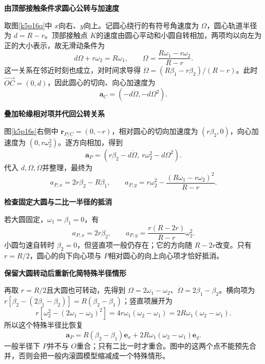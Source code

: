 \begin{solution}\textbf{由顶部接触条件求圆心公转与加速度}\par\nobreak
取图\ref{k5p16q}中 $x$向右、$y$向上。记圆心绕行的有符号角速度为 $\Omega$，圆心轨道半径为 $d=R-r$。顶部接触点 $K$的速度由圆心平动和小圆自转相加，两项均以向左为正的大小表示，故无滑动条件为
\[d\Omega+r\omega_2=R\omega_1,\qquad
\Omega=\frac{R\omega_1-r\omega_2}{R-r}.\]
这一关系在邻近时刻也成立，对时间求导得 $\dot\Omega=(R\beta_1-r\beta_2)/(R-r)$。此时 $\overrightarrow{OC}=(0,d)$，因此圆心的切向、向心加速度为
\[\bm a_C=(-d\dot\Omega,-d\Omega^2).\]



\par\medskip{}\noindent\textbf{叠加轮缘相对项并代回公转关系}\par\nobreak
图\ref{k5p16s}右侧中 $\bm r_{P/C}=(0,-r)$，相对圆心的切向加速度为 $(r\beta_2,0)$，向心加速度为 $(0,r\omega_2^2)$。逐方向相加，得到
\[\bm a_P=(r\beta_2-d\dot\Omega,\ r\omega_2^2-d\Omega^2).\]
代入 $d,\Omega,\dot\Omega$并整理，最终为
\[\boxed{a_{P,x}=2r\beta_2-R\beta_1},\qquad
\boxed{a_{P,y}=r\omega_2^2-\frac{(R\omega_1-r\omega_2)^2}{R-r}}.\]



\par\medskip{}\noindent\textbf{检查固定大圆与二比一半径的抵消}\par\nobreak
若大圆固定，$\omega_1=\beta_1=0$，有
\[a_{P,x}=2r\beta_2,\qquad
a_{P,y}=\frac{r(R-2r)}{R-r}\omega_2^2.\]
小圆匀速自转时 $\beta_2=0$，但竖直项一般仍存在；它的方向随 $R-2r$改变。只有 $r=R/2$，圆心的向下向心项与 $P$相对圆心的向上向心项才恰好抵消。



\par\medskip{}\noindent\textbf{保留大圆转动后重新化简特殊半径情形}\par\nobreak
再取 $r=R/2$且大圆也可转动，先得到 $\Omega=2\omega_1-\omega_2$、$\dot\Omega=2\beta_1-\beta_2$。横向项为 $r[\beta_2-(2\beta_1-\beta_2)]=R(\beta_2-\beta_1)$；竖直项展开为
\[r[\omega_2^2-(2\omega_1-\omega_2)^2]
 =4r\omega_1(\omega_2-\omega_1)
 =2R\omega_1(\omega_2-\omega_1).\]
所以这个特殊半径比恢复
\[\bm a_P=R(\beta_2-\beta_1)\bm e_x
       +2R\omega_1(\omega_2-\omega_1)\bm e_y.\]
一般半径下 $P$并不与 $O$重合；只有二比一时才重合。图中的这两个点不能预先合并，否则会把一般内滚圆模型缩减成一个特殊情形。
\end{solution}

